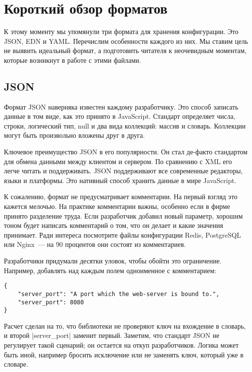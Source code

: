 \section{Короткий обзор форматов}

К этому моменту мы упомянули три формата для хранения конфигурации. Это JSON,
EDN и YAML. Перечислим особенности каждого из них. Мы ставим цель не выявить
идеальный формат, а подготовить читателя к неочевидным моментам, которые
возникнут в работе с этими файлами.

\subsection{JSON}

Формат JSON наверняка известен каждому разработчику. Это способ записать данные
в том виде, как это принято в JavaScript. Стандарт определяет числа, строки,
логический тип, null и два вида коллекций: массив и словарь. Коллекции могут
быть произвольно вложены друг в друга.

Ключевое преимущество JSON в его популярности. Он стал де-факто стандартом для
обмена данными между клиентом и сервером. По сравнению с XML его легче читать и
поддерживать. JSON поддерживают все современные редакторы, языки и
платформы. Это нативный способ хранить данные в мире JavaScript.

К сожалению, формат не предусматривает комментарии. На первый взгляд это кажется
мелочью. На практике комментарии важны, особенно если в фирме принято разделение
труда. Если разработчик добавил новый параметр, хорошим тоном будет написать
комментарий о том, что он делает и какие значения принимает. Ради интереса
посмотрите файлы конфигурации Redis, PostgreSQL или Nginx~--- на 90 процентов они
состоят из комментариев.

Разработчики придумали десятки уловок, чтобы обойти это ограничение. Например,
добавлять над каждым полем одноименное с комментарием:

\begin{verbatim}
{
    "server_port": "A port which the web-server is bound to.",
    "server_port": 8080
}
\end{verbatim}

Расчет сделан на то, что библиотеки не проверяют ключ на вхождение в словарь, и
второй \spverb|server_port| заменит первый. Заметим, что стандарт JSON не регулирует
такой сценарий; он остается на откуп разработчиков. Логика может быть иной,
например бросить исключение или не заменять ключ, который уже в словаре.


